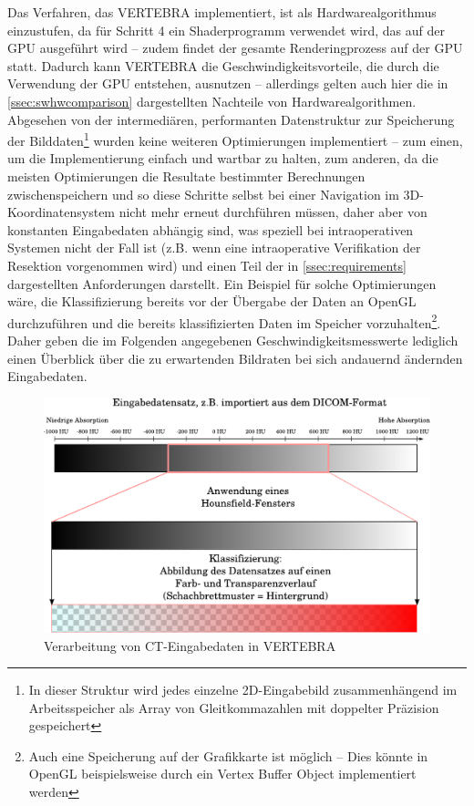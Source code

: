 \documentclass[ngerman,pdftex,paper=A4,DIV=calc,titlepage,12pt]{scrartcl}
\newtheorem[L]{boxedDefinition}{Definition}
\begin{document}
Das Verfahren, das VERTEBRA implementiert, ist als Hardwarealgorithmus einzustufen, da für Schritt 4 ein Shaderprogramm verwendet wird, das auf der GPU ausgeführt wird -- zudem findet der gesamte Renderingprozess auf der GPU statt. Dadurch kann VERTEBRA die Geschwindigkeitsvorteile, die durch die Verwendung der GPU entstehen, ausnutzen -- allerdings gelten auch hier die in \vref{ssec:swhwcomparison} dargestellten Nachteile von Hardwarealgorithmen. Abgesehen von der intermediären, performanten Datenstruktur zur Speicherung der Bilddaten\footnote{In dieser Struktur wird jedes einzelne 2D-Eingabebild zusammenhängend im Arbeitsspeicher als Array von Gleitkommazahlen mit doppelter Präzision gespeichert} wurden keine weiteren Optimierungen implementiert -- zum einen, um die Implementierung einfach und wartbar zu halten, zum anderen, da die meisten Optimierungen die Resultate bestimmter Berechnungen zwischenspeichern und so diese Schritte selbst bei einer Navigation im 3D-Koordinatensystem nicht mehr erneut durchführen müssen, daher aber von konstanten Eingabedaten abhängig sind, was speziell bei intraoperativen Systemen nicht der Fall ist (z.B. wenn eine intraoperative Verifikation der Resektion vorgenommen wird) und einen Teil der in \vref{ssec:requirements} dargestellten Anforderungen darstellt. Ein Beispiel für solche Optimierungen wäre, die Klassifizierung bereits vor der Übergabe der Daten an OpenGL durchzuführen und die bereits klassifizierten Daten im Speicher vorzuhalten\footnote{Auch eine Speicherung auf der Grafikkarte ist möglich -- Dies könnte in OpenGL beispielsweise durch ein Vertex Buffer Object implementiert werden}. Daher geben die im Folgenden angegebenen Geschwindigkeitsmesswerte lediglich einen Überblick über die zu erwartenden Bildraten bei sich andauernd ändernden Eingabedaten.

\begin{figure}[p]
\begin{center}
\includegraphics[width=\textwidth]{graphics/Classification.pdf}
\caption{Verarbeitung von CT-Eingabedaten in VERTEBRA}
\label{fig:gradientmapping-graphic}
\end{center}
\end{figure}\label{ssec:implementations}
\end{document}
